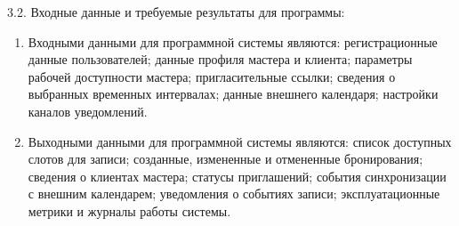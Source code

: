 {\parindent0pt
  3.2. Входные данные и требуемые результаты для программы:}

\begin{enumerate}
\item Входными данными для программной системы являются: регистрационные данные пользователей; данные профиля мастера и клиента; параметры рабочей доступности мастера; пригласительные ссылки; сведения о выбранных временных интервалах; данные внешнего календаря; настройки каналов уведомлений.
\item Выходными данными для программной системы являются: список доступных слотов для записи; созданные, измененные и отмененные бронирования; сведения о клиентах мастера; статусы приглашений; события синхронизации с внешним календарем; уведомления о событиях записи; эксплуатационные метрики и журналы работы системы.
\end{enumerate}

